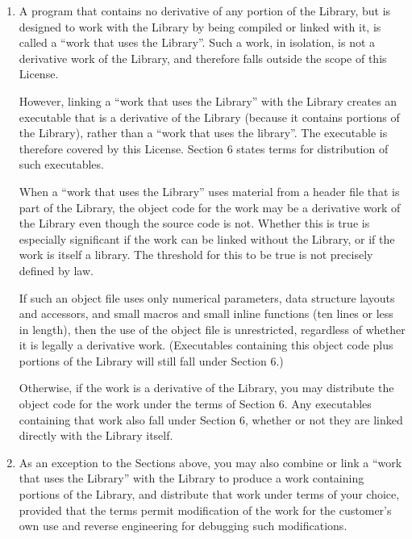 {\begin{multicols}{2}
\begin{enumerate}
If distribution of object code is made by offering access to copy from a 
designated place, then offering equivalent access to copy the source code from 
the same place satisfies the requirement to distribute the source code, even 
though third parties are not compelled to copy the source along with the object 
code. 

\item
A program that contains no derivative of any portion of the Library, but is 
designed to work with the Library by being compiled or linked with it, is called 
a ``work that uses the Library''. Such a work, in isolation, is not a derivative 
work of the Library, and therefore falls outside the scope of this License.

However, linking a ``work that uses the Library'' with the Library creates an 
executable that is a derivative of the Library (because it contains portions of 
the Library), rather than a ``work that uses the library''. The executable is 
therefore covered by this License. Section 6 states terms for distribution of 
such executables.

When a ``work that uses the Library'' uses material from a header file that is 
part of the Library, the object code for the work may be a derivative work of 
the Library even though the source code is not. Whether this is true is 
especially significant if the work can be linked without the Library, or if the 
work is itself a library. The threshold for this to be true is not precisely 
defined by law.

If such an object file uses only numerical parameters, data structure layouts 
and accessors, and small macros and small inline functions (ten lines or less in 
length), then the use of the object file is unrestricted, regardless of whether 
it is legally a derivative work. (Executables containing this object code plus 
portions of the Library will still fall under Section 6.)

Otherwise, if the work is a derivative of the Library, you may distribute the 
object code for the work under the terms of Section 6. Any executables 
containing that work also fall under Section 6, whether or not they are linked 
directly with the Library itself. 

\item
As an exception to the Sections above, you may also combine or link a ``work that 
uses the Library'' with the Library to produce a work containing portions of the 
Library, and distribute that work under terms of your choice, provided that the 
terms permit modification of the work for the customer's own use and reverse 
engineering for debugging such modifications.


\end{enumerate}
\end{multicols}}
